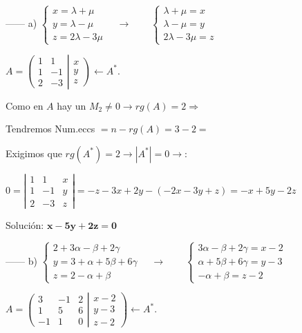 \begin{proofw}\renewcommand{\qedsymbol}{$\diamond$}

\vspace{-5mm}	

------ a) $\begin{cases} x=\lambda+\mu \\y=\lambda-\mu \\ z=2\lambda-3\mu\end{cases} \quad  \longrightarrow \qquad \begin{cases} \lambda+\mu=x \\\lambda-\mu=y \\ 2\lambda-3\mu=z\end{cases}$

$A=\left( \begin{matrix} \boxed{1}&\boxed{1}\\\boxed{1}&\boxed{-1}\\2&-3 \end{matrix} \right| \left. \begin{matrix} x\\y\\z \end{matrix} \right) \leftarrow A^*$. 

Como en $A$ hay un $\boxed{M_2}\neq 0 \to rg(A)=2 \Rightarrow $ 

Tendremos Num.eccs $= n- rg(A)= 3 -2 =$

Exigimos que $rg(A^*)=2 \to |A^*|=0 \to :$

$0=\left| \begin{matrix} \boxed{1}&\boxed{1}&x\\\boxed{1}&\boxed{-1}&y\\2&-3&z \end{matrix} \right| = -z-3x+2y-(-2x-3y+z)=-x+5y-2z $

Solución: $\boldsymbol{x-5y+2z=0}$

------ b) $\begin{cases} 2+3\alpha-\beta+2\gamma \\ y=3+\alpha+5\beta+6\gamma\\ z=2-\alpha+\beta\end{cases}  \quad \longrightarrow \qquad \begin{cases} 3\alpha-\beta+2\gamma=x-2 \\ \alpha+5\beta+6\gamma=y-3 \\ -\alpha+\beta=z-2 \end{cases} $

	
$A=\left( \begin{matrix} \boxed{3}&\boxed{-1}&2\\\boxed{1}&\boxed{5}&6\\-1&1&0 \end{matrix} \right| \left. \begin{matrix} x-2\\y-3\\z-2 \end{matrix} \right) \leftarrow A^*$.	


\end{proofw}
